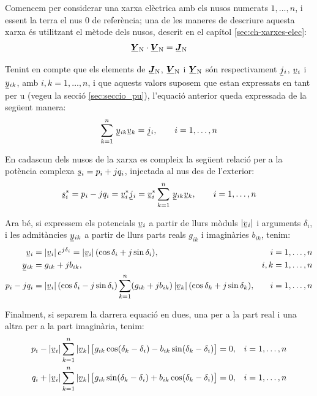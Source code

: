 Comencem per considerar una xarxa elèctrica amb els nusos numerats
$1,\ldots,n$, i essent la terra el nus 0 de referència; una de les
maneres de descriure aquesta xarxa és utilitzant el mètode dels
nusos, descrit en el capítol \ref{sec:ch-xarxes-elec}:
\begin{equation}
    \mcmplx{Y}\ped{N} \cdot \mcmplx{V}\ped{N} = \mcmplx{J}\ped{N}
\end{equation}

Tenint en compte que els elements de $\mcmplx{J}\ped{N}$,
$\mcmplx{V}\ped{N}$ i $\mcmplx{Y}\ped{N}$ són respectivament $\cmplx{j}_i$,
$\cmplx{v}_i$ i  $\cmplx{y}_{ik}$, amb $i,k=1,\ldots,n$, 
i que aquests valors suposem que estan expressats en tant per u (vegeu la
secció \ref{sec:seccio_pu}), l'equació anterior queda expressada de
la següent manera:
\begin{equation}
    \sum^n_{k=1}\, \cmplx{y}_{ik} \cmplx{v}_k = \cmplx{j}_i, \qquad i=1,\ldots,n
\end{equation}

En cadascun dels nusos de la xarxa es compleix la següent relació
per a la potència complexa $\cmplx{s}_i = p_i + j q_i$, injectada
al nus des de l'exterior:
\begin{equation}
    \cmplx{s}_i^* = p_i - j q_i = \cmplx{v}_i^* \cmplx{j}_i = \cmplx{v}_i^*
    \sum^n_{k=1}\, \cmplx{y}_{ik} \cmplx{v}_k, \qquad i=1,\ldots,n \label{eq:sconj}
\end{equation}

Ara bé, si expressem els potencials $\cmplx{v}_i$ a partir de llurs mòduls $|\cmplx{v}_i|$
i arguments $\delta_i$, i les admitàncies $\cmplx{y}_{ik}$ a partir de llurs parts reals $g_{ik}$ i imaginàries $b_{ik}$, tenim:
\begin{align}
    \cmplx{v}_i &=|\cmplx{v}_i|\, e^{j\delta_i} = |\cmplx{v}_i|\,
    (\cos\delta_i+j\sin\delta_i), & i & =1,\ldots,n\\
    \cmplx{y}_{ik} &= g_{ik} + j b_{ik}, & i,k & =1,\ldots,n \\
    p_i - j q_i &= |\cmplx{v}_i|\, (\cos\delta_i - j\sin\delta_i) \sum^n_{k=1} (g_{ik} + j
    b_{ik}) \,|\cmplx{v}_k| \,(\cos\delta_k + j\sin\delta_k), & i & =1,\ldots,n
\end{align}

Finalment, si separem la darrera equació en dues, una per a  la part real i  una altra per
a la part imaginària, tenim:
\begin{align}
    p_i - |\cmplx{v}_i| \sum^n_{k=1}  |\cmplx{v}_k|\, \bigl[ g_{ik} \cos(\delta_k - \delta_i) -
     b_{ik} \sin(\delta_k - \delta_i) \bigr] &= 0,  & i&=1,\ldots,n\label{eq:p0} \\
    q_i + |\cmplx{v}_i| \sum^n_{k=1}  |\cmplx{v}_k| \,\bigl[ g_{ik} \sin(\delta_k - \delta_i) +
      b_{ik} \cos(\delta_k - \delta_i) \bigr] &= 0, & i&=1,\ldots,n\label{eq:q0}
\end{align}


